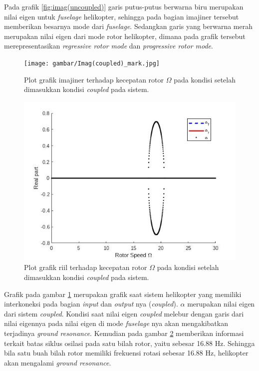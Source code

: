 Pada grafik \ref{fig:imag(uncoupled)} garis putus-putus berwarna biru merupakan nilai eigen untuk \textit{fuselage} helikopter, sehingga pada bagian imajiner tersebut memberikan besarnya mode dari \textit{fuselage}. Sedangkan garis yang berwarna merah merupakan nilai eigen dari mode rotor helikopter, dimana pada grafik tersebut merepresentasikan \textit{regressive rotor mode} dan \textit{progressive rotor mode}. 

\begin{figure}[H]
	\centering
	\texttt{[image: gambar/Imag(coupled)\_mark.jpg]}
	\caption{Plot grafik imajiner terhadap kecepatan rotor $\Omega$ pada kondisi setelah dimasukkan kondisi \textit{coupled} pada sistem.}
	\label{fig:imag(coupled)}
\end{figure}

\begin{figure}[H]
	\centering
	\includegraphics[width=0.7\linewidth]{gambar/Real(coupled).jpg}
	\caption{Plot grafik riil terhadap kecepatan rotor $\Omega$ pada kondisi setelah dimasukkan kondisi \textit{coupled} pada sistem.}
	\label{fig:real(coupled)}
\end{figure}

Grafik pada gambar \ref{fig:imag(coupled)} merupakan grafik saat sistem helikopter yang memiliki interkoneksi pada bagian \textit{input} dan \textit{output} nya (\textit{coupled}). $\alpha$ merupakan nilai eigen dari sistem \textit{coupled}. Kondisi saat nilai eigen \textit{coupled} melebur dengan garis dari nilai eigennya pada nilai eigen di mode \textit{fuselage} nya akan mengakibatkan terjadinya \textit{ground resonance}. Kemudian pada gambar \ref{fig:real(coupled)} memberikan informasi terkait batas siklus osilasi pada satu bilah rotor, yaitu sebesar 16.88 Hz. Sehingga bila satu buah bilah rotor memiliki frekuensi rotasi sebesar 16.88 Hz, helikopter akan mengalami \textit{ground resonance}.

